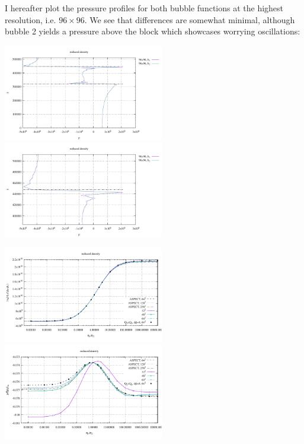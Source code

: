 I hereafter plot the pressure profiles for both bubble functions at the highest resolution, i.e. $96\times 96$.
We see that differences are somewhat minimal, although bubble 2 yields a pressure above the block which 
showcases worrying oscillations:

\begin{center}
\includegraphics[width=7cm]{python_codes/fieldstone_72/results/block/reduced/plines_b12}
\includegraphics[width=7cm]{python_codes/fieldstone_72/results/block/reduced/plines_b12_zoom}
\end{center}



\includegraphics[width=7cm]{python_codes/fieldstone_72/results/block/reduced/results_v}
\includegraphics[width=7cm]{python_codes/fieldstone_72/results/block/reduced/results_p}



